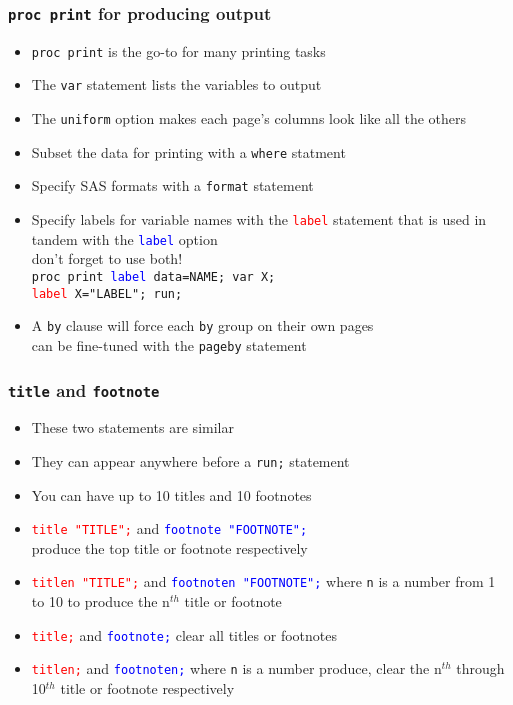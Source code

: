 \documentclass[11pt,pdftex,dvipsnames,usenames,helvetica]{beamer}
\begin{document}
\begin{frame}[fragile]
\frametitle{{\tt proc print} for producing output}
\begin{itemize}
\item {\tt proc print} is the go-to for many printing tasks
\item The {\tt var} statement lists the variables to output
\item The {\tt uniform} option makes each page's columns look like all
  the others
\item Subset the data for printing with a {\tt where} statment
\item Specify SAS formats with a {\tt format} statement
\item Specify labels for variable names with the 
\textcolor{red}{\tt label} statement that is used in tandem with the
  \textcolor{blue}{\tt label} option\\ don't forget to use both!\\
{\tt proc print \textcolor{blue}{\tt label} data=NAME;
var X;\\
 \textcolor{red}{label} X="LABEL"; run;}
\item A {\tt by} clause will force each {\tt by} group on their own pages\\
can be fine-tuned with the {\tt pageby} statement
\end{itemize}

\end{frame}

\begin{frame}[fragile]
\frametitle{{\tt title} and {\tt footnote}}
\begin{itemize}
\item These two statements are similar
\item They can appear anywhere before a {\tt run;} statement
\item You can have up to 10 titles and 10 footnotes
\item \textcolor{red}{\tt title "TITLE";} and 
\textcolor{blue}{\tt footnote "FOOTNOTE";}\\
produce the top title or footnote respectively
\item \textcolor{red}{\tt titlen "TITLE";} and 
\textcolor{blue}{\tt footnoten "FOOTNOTE";} where {\tt n} is a number
from 1 to 10 to
 produce the n$^{th}$ title or footnote %
\item \textcolor{red}{\tt title;} and 
\textcolor{blue}{\tt footnote;} clear all titles or footnotes
\item \textcolor{red}{\tt titlen;} and 
\textcolor{blue}{\tt footnoten;} where {\tt n} is a number
produce, clear the n$^{th}$ through 10$^{th}$ title or footnote respectively
\end{itemize}

\end{frame}
\end{document}
